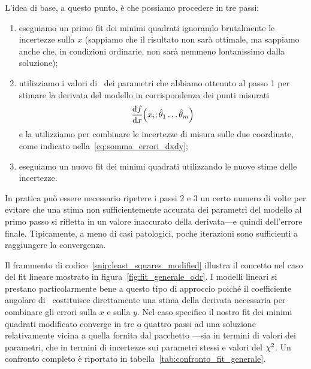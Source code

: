 L'idea di base, a questo punto, è che possiamo procedere in tre passi:
\begin{enumerate}
\item eseguiamo un primo fit dei minimi quadrati ignorando brutalmente
  le incertezze sulla $x$ (sappiamo che il risultato non sarà ottimale, ma
  sappiamo anche che, in condizioni ordinarie, non sarà nemmeno lontanissimo
  dalla soluzione);
\item utilizziamo i valori di \bestfit\ dei parametri che abbiamo ottenuto
  al passo 1 per stimare la derivata del modello in corrispondenza dei punti
  misurati
  \begin{align*}
    \td{f}{x}{x_i; \hat{\theta}_1 \ldots \hat{\theta}_m}
  \end{align*}
  e la utilizziamo per combinare le incertezze di misura sulle due
  coordinate, come indicato nella~\eqref{eq:somma_errori_dxdy};
\item eseguiamo un nuovo fit dei minimi quadrati utilizzando le nuove
  stime delle incertezze.
\end{enumerate}
In pratica può essere necessario ripetere i passi 2 e 3 un certo numero di
volte per evitare che una stima non sufficientemente accurata dei parametri del
modello al primo passo si rifletta in un valore inaccurato della derivata---e
quindi dell'errore finale. Tipicamente, a meno di casi patologici, poche
iterazioni sono sufficienti a raggiungere la convergenza.

Il frammento di codice~\ref{snip:least_squares_modified} illustra il concetto
nel caso del fit lineare mostrato in figura~\ref{fig:fit_generale_odr}.
I modelli lineari si prestano particolarmente bene a questo tipo di approccio
poiché il coefficiente angolare di \bestfit\ costituisce direttamente
una stima della derivata necessaria per combinare gli errori sulla $x$ e sulla
$y$. Nel caso specifico il nostro fit dei minimi quadrati modificato converge
in tre o quattro passi ad una soluzione relativamente vicina a quella fornita
dal pacchetto ---sia in termini di valori dei parametri,
che in termini di incertezze sui parametri stessi e valori del $\chi^2$. Un
confronto completo è riportato in tabella~\ref{tab:confronto_fit_generale}.

\begin{table}[htbp]
\end{table}



